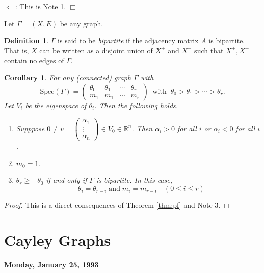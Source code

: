 \documentclass[
]{book}
\newtheorem{corollary}{Corollary}[chapter]
\theoremstyle{definition}
\newtheorem{definition}{Definition}[chapter]
\theoremstyle{definition}
\theoremstyle{definition}
\theoremstyle{definition}
\theoremstyle{remark}
\begin{document}
\(\Leftarrow\): This is Note 1.
\(\Box\)

Let \(\Gamma = (X, E)\) be any graph.

\begin{definition}
\(\Gamma\) is said to be \emph{bipartite} if the adjacency matrix \(A\) is bipartite. That is, \(X\) can be written as a disjoint union of \(X^+\) and \(X^-\) such that \(X^+, X^-\) contain no edges of \(\Gamma\).
\end{definition}

\begin{corollary}

For any (connected) graph \(\Gamma\) with
\[\mathrm{Spec}(\Gamma) = \begin{pmatrix}\theta_0 & \theta_1 &\cdots & \theta_r\\m_1 & m_1 & \cdots & m_r\end{pmatrix} \:\textrm{ with }\: \theta_0 > \theta_1 > \cdots > \theta_r.\]
Let \(V_i\) be the eigenspace of \(\theta_i\). Then the following holds.

\begin{enumerate}
\def\labelenumi{\arabic{enumi}.}
\item
  Supppose \(0\neq v = \begin{pmatrix} \alpha_1\\\vdots \\\alpha_n \end{pmatrix} \in V_0\in \mathbb{R}^n\). Then \(\alpha_i > 0\) for all \(i\) or \(\alpha_i < 0\) for all \(i\).
\item
  \(m_0 = 1\).
\item
  \(\theta_r \geq -\theta_0\) if and only if \(\Gamma\) is bipartite. In this case,
  \[-\theta_i = \theta_{r-i} \; \textrm{and} \; m_i = m_{r-i} \quad (0\leq i\leq r)\]
\end{enumerate}

\end{corollary}

\begin{proof}
This is a direct consequences of Theorem \ref{thm:pf} and Note 3.
\end{proof}

\hypertarget{lec3}{%
\chapter{Cayley Graphs}\label{lec3}}

\textbf{Monday, January 25, 1993}
\end{document}
